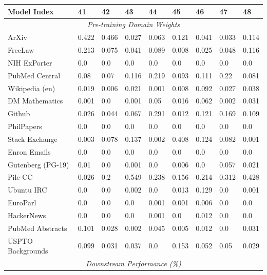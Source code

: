 \documentclass{article}
\theoremstyle{definition}
\theoremstyle{remark}
\begin{document}
\begin{table}[!ht]
    \centering
    \begin{tabular}{lllllllll}
    \toprule
        \textbf{Model Index} & \textbf{41} & \textbf{42} & \textbf{43} & \textbf{44} & \textbf{45} & \textbf{46} & \textbf{47} & \textbf{48} \\ \midrule
        \multicolumn{9}{c}{\textit{Pre-training Domain Weights}} \\
        ArXiv & 0.422 & 0.466 & 0.027 & 0.063 & 0.121 & 0.041 & 0.033 & 0.114 \\ 
        FreeLaw & 0.213 & 0.075 & 0.041 & 0.089 & 0.008 & 0.025 & 0.048 & 0.116 \\ 
        NIH ExPorter & 0.0 & 0.0 & 0.0 & 0.0 & 0.0 & 0.0 & 0.0 & 0.0 \\ 
        PubMed Central & 0.08 & 0.07 & 0.116 & 0.219 & 0.093 & 0.111 & 0.22 & 0.081 \\ 
        Wikipedia (en) & 0.019 & 0.006 & 0.021 & 0.001 & 0.008 & 0.092 & 0.027 & 0.038 \\ 
        DM Mathematics & 0.001 & 0.0 & 0.001 & 0.05 & 0.016 & 0.062 & 0.002 & 0.031 \\ 
        Github & 0.026 & 0.044 & 0.067 & 0.291 & 0.012 & 0.121 & 0.169 & 0.109 \\ 
        PhilPapers & 0.0 & 0.0 & 0.0 & 0.0 & 0.0 & 0.0 & 0.0 & 0.0 \\ 
        Stack Exchange & 0.003 & 0.078 & 0.137 & 0.002 & 0.408 & 0.124 & 0.082 & 0.001 \\ 
        Enron Emails & 0.0 & 0.0 & 0.0 & 0.0 & 0.0 & 0.0 & 0.0 & 0.0 \\ 
        Gutenberg (PG-19) & 0.01 & 0.0 & 0.001 & 0.0 & 0.006 & 0.0 & 0.057 & 0.021 \\ 
        Pile-CC & 0.026 & 0.2 & 0.549 & 0.238 & 0.156 & 0.214 & 0.312 & 0.428 \\ 
        Ubuntu IRC & 0.0 & 0.0 & 0.002 & 0.0 & 0.013 & 0.129 & 0.0 & 0.001 \\ 
        EuroParl & 0.0 & 0.0 & 0.0 & 0.001 & 0.001 & 0.006 & 0.0 & 0.0 \\ 
        HackerNews & 0.0 & 0.0 & 0.0 & 0.001 & 0.0 & 0.012 & 0.0 & 0.0 \\ 
        PubMed Abstracts & 0.101 & 0.028 & 0.002 & 0.045 & 0.005 & 0.012 & 0.0 & 0.031 \\ 
        USPTO Backgrounds & 0.099 & 0.031 & 0.037 & 0.0 & 0.153 & 0.052 & 0.05 & 0.029 \\ 
        \midrule
        \multicolumn{9}{c}{\textit{Downstream Performance (\%)}} \\

\end{tabular}
\end{table}
\end{document}
